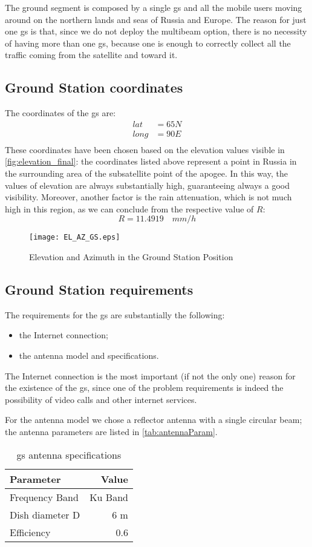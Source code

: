 The ground segment is composed by a single \gls{gs} and all the mobile users moving around on the northern lands and     seas of Russia and Europe. The reason for just one \gls{gs} is that, since we do not deploy the multibeam option, there is no necessity of having more than one \gls{gs}, because one is enough to correctly collect all the traffic coming from the satellite and toward it.
\subsection{Ground Station coordinates}
	The coordinates of the \gls{gs} are:
	\begin{align}
	lat &= 65N\\
	long &= 90E\\
	\end{align}
	These coordinates have been chosen based on the elevation values visible in \autoref{fig:elevation_final}: the coordinates listed above represent a point in Russia in the surrounding area of the subsatellite point of the apogee. In this way, the values of elevation are always substantially high, guaranteeing always a good visibility. Moreover, another factor is the rain attenuation, which is not much high in this region, as we can conclude from the respective value of $R$:
	\begin{equation}
	R = 11.4919 \quad mm/h
	\end{equation}
	\begin{figure}[htbp]
		\centering
		\texttt{[image: EL\_AZ\_GS.eps]}
		\caption{Elevation and Azimuth in the Ground Station Position}
		\label{fig:elevation_final}
	\end{figure}
\subsection{Ground Station requirements}
	The requirements for the \gls{gs} are substantially the following:
	\begin{itemize}
		\item the Internet connection;
		\item the antenna model and specifications.
	\end{itemize}

	The Internet connection is the most important (if not the only one) reason for the existence of the \gls{gs}, since one of 			the problem requirements is indeed the possibility of video calls and other internet services.

	For the antenna model we chose a reflector antenna with a single circular beam; the antenna parameters are listed in \autoref{tab:antennaParam}.
	\begin{table}
		\centering
		\begin{tabular}{lr}
		\toprule
		Parameter & Value\\
		\midrule
		Frequency Band & Ku Band\\
		Dish diameter D & 6 m\\
		Efficiency & 0.6\\
		\bottomrule
		\end{tabular}
		\caption{\gls{gs} antenna specifications}
		\label{tab:antennaParam}
	\end{table}

